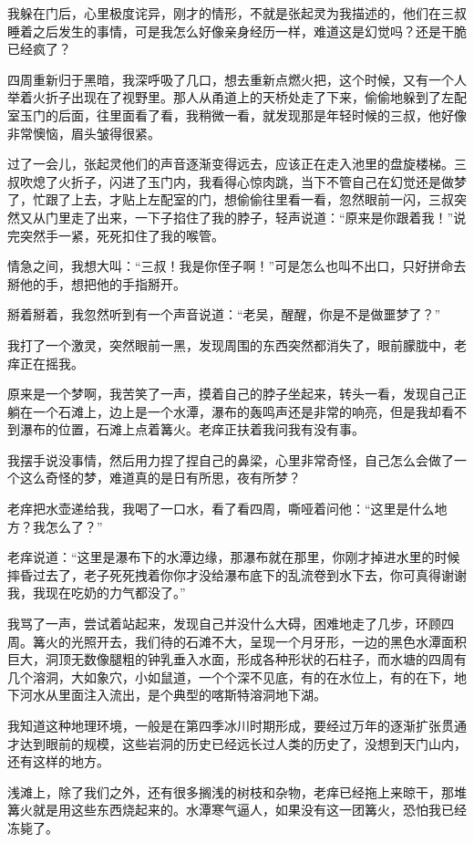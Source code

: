 我躲在门后，心里极度诧异，刚才的情形，不就是张起灵为我描述的，他们在三叔睡着之后发生的事情，可是我怎么好像亲身经历一样，难道这是幻觉吗？还是干脆已经疯了？

四周重新归于黑暗，我深呼吸了几口，想去重新点燃火把，这个时候，又有一个人举着火折子出现在了视野里。那人从甬道上的天桥处走了下来，偷偷地躲到了左配室玉门的后面，往里面看了看，我稍微一看，就发现那是年轻时候的三叔，他好像非常懊恼，眉头皱得很紧。

过了一会儿，张起灵他们的声音逐渐变得远去，应该正在走入池里的盘旋楼梯。三叔吹熄了火折子，闪进了玉门内，我看得心惊肉跳，当下不管自己在幻觉还是做梦了，忙跟了上去，才贴上左配室的门，想偷偷往里看一看，忽然眼前一闪，三叔突然又从门里走了出来，一下子掐住了我的脖子，轻声说道：“原来是你跟着我！”说完突然手一紧，死死扣住了我的喉管。

情急之间，我想大叫：“三叔！我是你侄子啊！”可是怎么也叫不出口，只好拼命去掰他的手，想把他的手指掰开。

掰着掰着，我忽然听到有一个声音说道：“老吴，醒醒，你是不是做噩梦了？”

我打了一个激灵，突然眼前一黑，发现周围的东西突然都消失了，眼前朦胧中，老痒正在摇我。

原来是一个梦啊，我苦笑了一声，摸着自己的脖子坐起来，转头一看，发现自己正躺在一个石滩上，边上是一个水潭，瀑布的轰鸣声还是非常的响亮，但是我却看不到瀑布的位置，石滩上点着篝火。老痒正扶着我问我有没有事。

我摆手说没事情，然后用力捏了捏自己的鼻梁，心里非常奇怪，自己怎么会做了一个这么奇怪的梦，难道真的是日有所思，夜有所梦？

老痒把水壶递给我，我喝了一口水，看了看四周，嘶哑着问他：“这里是什么地方？我怎么了？”

老痒说道：“这里是瀑布下的水潭边缘，那瀑布就在那里，你刚才掉进水里的时候摔昏过去了，老子死死拽着你你才没给瀑布底下的乱流卷到水下去，你可真得谢谢我，我现在吃奶的力气都没了。”

我骂了一声，尝试着站起来，发现自己并没什么大碍，困难地走了几步，环顾四周。篝火的光照开去，我们待的石滩不大，呈现一个月牙形，一边的黑色水潭面积巨大，洞顶无数像腿粗的钟乳垂入水面，形成各种形状的石柱子，而水塘的四周有几个溶洞，大如象穴，小如鼠道，一个个深不见底，有的在水位上，有的在下，地下河水从里面注入流出，是个典型的喀斯特溶洞地下湖。

我知道这种地理环境，一般是在第四季冰川时期形成，要经过万年的逐渐扩张贯通才达到眼前的规模，这些岩洞的历史已经远长过人类的历史了，没想到天门山内，还有这样的地方。

浅滩上，除了我们之外，还有很多搁浅的树枝和杂物，老痒已经拖上来晾干，那堆篝火就是用这些东西烧起来的。水潭寒气逼人，如果没有这一团篝火，恐怕我已经冻毙了。

